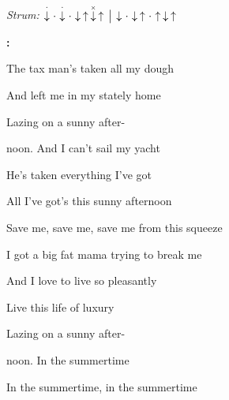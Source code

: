 \begin{song}


\begin{headerbox}
\RaiseBoxWithAccents
\textit{Strum:} $\StaccatoDown\Miss\StaccatoDown\Miss\Down\Up\ChuckDown\Up
\Separator \Down\Miss\Down\Up\Miss\Up\Down\Up$
\end{headerbox}

\begin{chordbox}
\end{chordbox}

\large

\bigskip

\Intro\textbf{:}     \par

\bigskip

The tax man's taken all my dough \par
And left me in my stately home \par
{}Lazing on a sunny after- \par
{}noon. And I can't sail my yacht \par
He's taken everything I've got \par
{}All I've got's this sunny afternoon \par

\bigskip

Save me, save me, save me from this squeeze \par
I got a big fat mama trying to break me  \par

\bigskip

\begin{chorusbox}{\Chorus}
And I love to live so pleasantly \par
{}Live this life of luxury  \par
{}Lazing on a sunny after- \par
{}noon. In the summertime \par
In the summertime, in the summertime \par
\end{chorusbox}


\end{song}

